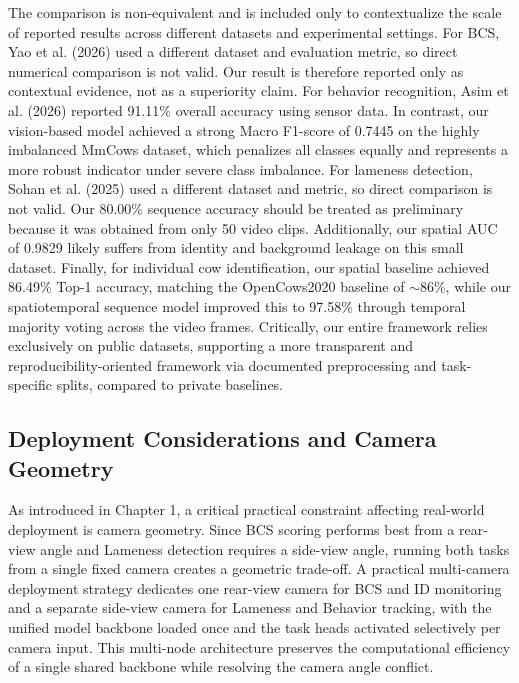 The comparison is non-equivalent and is included only to contextualize the scale of reported results across different datasets and experimental settings. For BCS, Yao et al. (2026) \cite{yao2026jds2} used a different dataset and evaluation metric, so direct numerical comparison is not valid. Our result is therefore reported only as contextual evidence, not as a superiority claim. For behavior recognition, Asim et al. (2026) \cite{asim2026s260} reported 91.11\% overall accuracy using sensor data. In contrast, our vision-based model achieved a strong Macro F1-score of 0.7445 on the highly imbalanced MmCows dataset, which penalizes all classes equally and represents a more robust indicator under severe class imbalance. For lameness detection, Sohan et al. (2025) \cite{sohan2025s415} used a different dataset and metric, so direct comparison is not valid. Our 80.00\% sequence accuracy should be treated as preliminary because it was obtained from only 50 video clips. Additionally, our spatial AUC of 0.9829 likely suffers from identity and background leakage on this small dataset. Finally, for individual cow identification, our spatial baseline achieved 86.49\% Top-1 accuracy, matching the OpenCows2020 baseline of $\sim$86\%, while our spatiotemporal sequence model improved this to 97.58\% through temporal majority voting across the video frames. Critically, our entire framework relies exclusively on public datasets, supporting a more transparent and reproducibility-oriented framework via documented preprocessing and task-specific splits, compared to private baselines.

\subsection{Deployment Considerations and Camera Geometry}
As introduced in Chapter 1, a critical practical constraint affecting real-world deployment is camera geometry. Since BCS scoring performs best from a rear-view angle and Lameness detection requires a side-view angle, running both tasks from a single fixed camera creates a geometric trade-off. A practical multi-camera deployment strategy dedicates one rear-view camera for BCS and ID monitoring and a separate side-view camera for Lameness and Behavior tracking, with the unified model backbone loaded once and the task heads activated selectively per camera input. This multi-node architecture preserves the computational efficiency of a single shared backbone while resolving the camera angle conflict.

